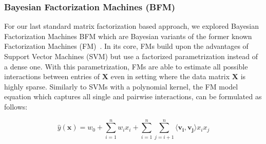 \documentclass[10pt,conference,compsocconf]{IEEEtran}
\begin{document}
    \subsubsection{Bayesian Factorization Machines (BFM)}
    For our last standard matrix factorization based approach, we explored Bayesian Factorization Machines BFM which are Bayesian variants of the former known Factorization Machines (FM)~\cite{rendle_factorization_2010}.
    In its core, FMs build upon the advantages of Support Vector Machines (SVM) but use a factorized parametrization instead of a dense one.
    With this parametrization, FMs are able to estimate all possible interactions between entries of $\mathbf{X}$ even in setting where the data matrix $\mathbf{X}$ is highly sparse.
    Similarly to SVMs with a polynomial kernel, the FM model equation which captures all single and pairwise interactions, can be formulated as follows:

    $$\hat{y}(\mathbf{x})=w_0+\sum^n_{i=1}w_ix_i + \sum^n_{i=1}\sum^n_{j=i+1}\langle \mathbf{v_i},\mathbf{v_j} \rangle x_ix_j$$
\end{document}
